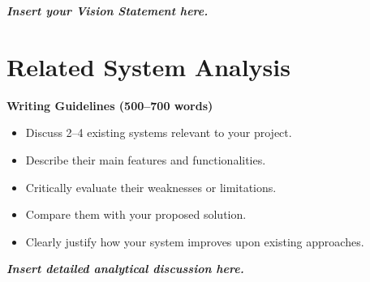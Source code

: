 \vspace{0.5cm}

\textbf{\textit{Insert your Vision Statement here.}}




\section{Related System Analysis}

\textbf{Writing Guidelines (500–700 words)}

\begin{itemize}
    \item Discuss 2–4 existing systems relevant to your project.
    \item Describe their main features and functionalities.
    \item Critically evaluate their weaknesses or limitations.
    \item Compare them with your proposed solution.
    \item Clearly justify how your system improves upon existing approaches.
\end{itemize}

\vspace{0.5cm}

\textbf{\textit{Insert detailed analytical discussion here.}}

\vspace{0.5cm}

